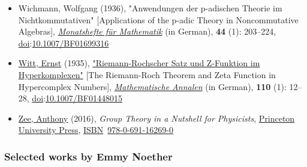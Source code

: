 \begin{itemize}
\item
  Wichmann, Wolfgang (1936), "Anwendungen der p-adischen Theorie im Nichtkommutativen" {{[}}Applications of the p-adic Theory in Noncommutative Algebras{{]}}, \emph{\href{https://en.wikipedia.org/wiki/Monatshefte_für_Mathematik}{Monatshefte für Mathematik}} (in German), \textbf{44} (1): {203--}224, \href{https://en.wikipedia.org/wiki/Doi_(identifier)}{doi}:\href{https://doi.org/10.1007\%2FBF01699316}{10.1007/BF01699316}{}
\item
  \href{https://en.wikipedia.org/wiki/Ernst_Witt}{Witt, Ernst} (1935), {\href{http://gdz.sub.uni-goettingen.de/dms/resolveppn/?PPN=GDZPPN002277085}{"Riemann-Rochscher Satz und Z-Funktion im Hyperkomplexen"}} {{[}}The Riemann-Roch Theorem and Zeta Function in Hypercomplex Numbers{{]}}, \emph{\href{https://en.wikipedia.org/wiki/Mathematische_Annalen}{Mathematische Annalen}} (in German), \textbf{110} (1): {12--}28, \href{https://en.wikipedia.org/wiki/Doi_(identifier)}{doi}:\href{https://doi.org/10.1007\%2FBF01448015}{10.1007/BF01448015}{}
\item
  \href{https://en.wikipedia.org/wiki/Anthony_Zee}{Zee, Anthony} (2016), \emph{Group Theory in a Nutshell for Physicists}, \href{https://en.wikipedia.org/wiki/Princeton_University_Press}{Princeton University Press}, \href{https://en.wikipedia.org/wiki/ISBN_(identifier)}{ISBN}{~}\href{https://en.wikipedia.org/wiki/Special:BookSources/978-0-691-16269-0}{978-0-691-16269-0}{}
\end{itemize}


\subsubsection{Selected works by Emmy Noether}\label{Selected_works_by_Emmy_Noether}


